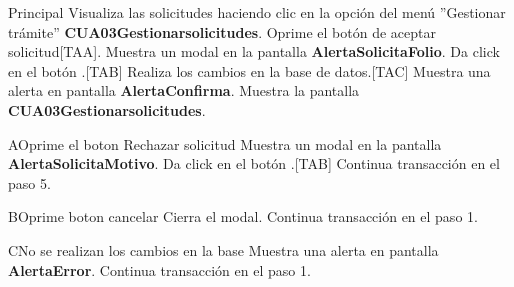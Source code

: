 \begin{UCtrayectoria}{Principal}
  \UCpaso[\UCactor] Visualiza las solicitudes haciendo clic en la opción del menú ''Gestionar trámite'' {\bf CUA03Gestionarsolicitudes}.
  \UCpaso [\UCactor] Oprime el botón de aceptar solicitud[TAA].
	\UCpaso Muestra un modal en la pantalla {\bf AlertaSolicitaFolio}.
  \UCpaso [\UCactor] Da click en el botón .[TAB]
	\UCpaso Realiza los cambios en la base de datos.[TAC]
	\UCpaso Muestra una alerta en pantalla {\bf AlertaConfirma}.
	\UCpaso Muestra la pantalla {\bf CUA03Gestionarsolicitudes}.
\end{UCtrayectoria}

\begin{UCtrayectoriaA}{A}{Oprime el boton Rechazar solicitud} 
	\UCpaso Muestra un modal en la pantalla {\bf AlertaSolicitaMotivo}.
  \UCpaso [\UCactor] Da click en el botón .[TAB]
	\UCpaso Continua transacción en el paso 5.
\end{UCtrayectoriaA}

\begin{UCtrayectoriaA}{B}{Oprime boton cancelar} 
  \UCpaso Cierra el modal.
  \UCpaso Continua transacción en el paso 1.
\end{UCtrayectoriaA}

\begin{UCtrayectoriaA}{C}{No se realizan los cambios en la base} 
  \UCpaso  Muestra una alerta en pantalla {\bf AlertaError}.
  \UCpaso Continua transacción en el paso 1.
\end{UCtrayectoriaA}

